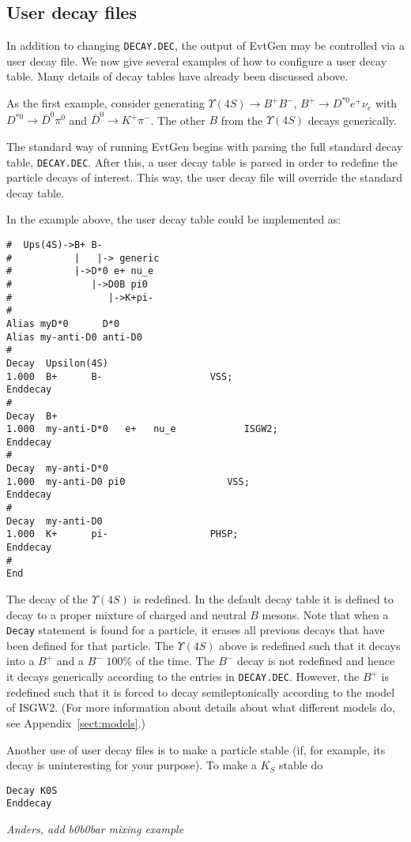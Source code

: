 \subsection{User decay files}
\label{sec:userdecayfiles}
In addition to changing {\tt DECAY.DEC}, the output of
EvtGen may be controlled via a user decay file.  
We now give several examples of how to configure a user decay
table. Many details of decay
tables have already been discussed above. 

As the first example, consider generating $\Upsilon(4S) \to B^+ B^-$,  
$B^{+}\rightarrow D^{*0}e^{+}\nu_{e}$ with 
$D^{*0}\rightarrow \bar D^{0}\pi^{0}$ and $\bar D^{0}\rightarrow K^{+}\pi^{-}$.
The other $B$ from the $\Upsilon(4S)$ decays generically. 

The standard way of running EvtGen begins with 
parsing the full standard decay table, {\tt DECAY.DEC}.  After this,
a user decay table is parsed in order to
redefine the particle decays of interest.  This way, the
user decay file will override the standard decay table.

In the example above, the user decay table could be implemented as:
\begin{verbatim}
#  Ups(4S)->B+ B-
#           |   |-> generic
#           |->D*0 e+ nu_e
#              |->D0B pi0
#                 |->K+pi-
#
Alias myD*0      D*0
Alias my-anti-D0 anti-D0
#
Decay  Upsilon(4S)
1.000  B+      B-                   VSS;
Enddecay
#
Decay  B+
1.000  my-anti-D*0   e+   nu_e            ISGW2;
Enddecay
#
Decay  my-anti-D*0
1.000  my-anti-D0 pi0                  VSS;
Enddecay
#
Decay  my-anti-D0
1.000  K+      pi-                  PHSP;
Enddecay
#
End
\end{verbatim}

The decay of the $\Upsilon(4S)$ is redefined.  In the default decay table
it is defined to decay to a proper mixture of 
charged and neutral $B$ mesons. Note that
when a {\tt Decay} statement is found for a particle, it erases all previous 
decays that have been defined for that particle. 
The $\Upsilon(4S)$ above is redefined such that it 
decays into a $B^+$ and a $B^-$
$100\%$ of the time. The $B^-$ decay is not 
redefined and hence it decays generically
according to the entries in {\tt DECAY.DEC}. However, 
the $B^+$ is redefined such that it is forced to
decay semileptonically according to the model of 
ISGW2. (For more information about details
about what different models do, see Appendix~\ref{sect:models}.) 

Another use of user decay files is to make a particle stable (if, for example,
its decay is uninteresting for your purpose).  To make a $K_S$ stable do
\begin{verbatim}
Decay K0S
Enddecay
\end{verbatim}

{\it Anders, add b0b0bar mixing example}



